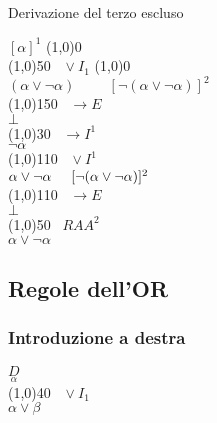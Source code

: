 \documentclass{article}
\theoremstyle{break}
\theoremstyle{break}
\theoremstyle{break}
\theoremstyle{break}
\begin{document}
\begin{example}
    Derivazione del terzo escluso

            \begin{center}
                \hspace{0cm}\( [\alpha]^1 \) \hspace{2.8cm} \line(1,0){0} \\
                \hspace{0cm}\line(1,0){50}\(\;\;\; \vee I_1 \) \hspace{2cm} \line(1,0){0}\\
            \( (\alpha \vee \neg \alpha) \hspace{1cm} [\neg(\alpha \vee \neg \alpha)]^2 \) \\
            \hspace{0.9cm}\line(1,0){150}\(\;\;\; \to E \)\\  
            \( \bot \) \\ 
            \hspace{0.9cm}\line(1,0){30}\(\;\;\; \to I^1 \)\\  
            \( \neg \alpha \)\\
            \hspace{0.9cm}\line(1,0){110}\(\;\;\; \vee I^1 \)\\  
            \( \alpha \vee \neg \alpha \hspace{0.5cm} [\neg (\alpha \vee \neg \alpha)]^2 \) \\
            \hspace{0.9cm}\line(1,0){110}\(\;\;\; \to E \)\\  
            \( \bot \) \\
            \hspace{0.9cm}\line(1,0){50}\(\;\;\; RAA^2  \)\\  
            \( \alpha \vee \neg \alpha \) 
        \end{center}
\end{example}


\subsection{Regole dell'OR}
\subsubsection{Introduzione a destra}
\begin{center}
    \( \underset{\alpha}{D} \) \\
    \hspace{0.9cm}\line(1,0){40}\(\;\;\; \vee I_1 \)\\  
    \( \alpha \vee \beta \)
\end{center}
\end{document}
